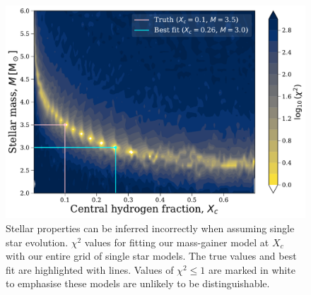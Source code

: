 \documentclass[twocolumn, twocolappendix, oneside]{aastex631}
\makeatletter
\newcommand{\unit}[1]{%
    \,\mathrm{#1}\checknextarg}
\newcommand{\checknextarg}{\@ifnextchar\bgroup{\gobblenextarg}{}}
\newcommand{\gobblenextarg}[1]{\,\mathrm{#1}\@ifnextchar\bgroup{\gobblenextarg}{}}
\newif\ifstartedinmathmode
\newcommand{\msun}{%
  \relax\ifmmode\startedinmathmodetrue\else\startedinmathmodefalse\fi
  {\ifstartedinmathmode\unit{M_{\odot}}\else$\unit{M_{\odot}}$\fi}\xspace%
}
\newif\ifstartedinmathmode
\makeatother
\begin{document}
\begin{figure}[tb]
    \centering
    \includegraphics[width=\columnwidth]{figures/chi2_xc_0.1.pdf}
    \caption{Stellar properties can be inferred incorrectly when assuming single star evolution. $\chi^2$ values for fitting our mass-gainer model at $X_c$ with our entire grid of single star models. The true values and best fit are highlighted with lines. Values of $\chi^2 \le 1$ are marked in white to emphasise these models are unlikely to be distinguishable.}
    \label{fig:chi2_xc_0.2}
\end{figure}

\end{document}
